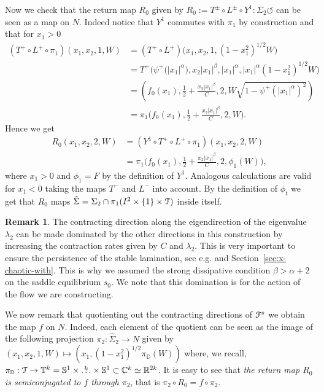 \documentclass[reqno,12pt,a4paper]{amsart}
\theoremstyle{plain}
\theoremstyle{definition}
\newtheorem{remark}[theorem]{Remark}
\begin{document}
Now we check that the return map $R_0$ given by
$
R_0:= T^\pm \circ L^\pm \circ Y^1:\Sigma_2\circlearrowleft
$
can be seen as a map on $N$.  Indeed notice that $Y^1$
commutes with $\pi_1$ by construction and that for $x_1>0$
\begin{align*}
  (T^+\circ L^+\circ \pi_1)(x_1,x_2,1,W) &= (T^+\circ
  L^+)\big(x_1,x_2,1,(1-x_1^2)^{1/2} W\big)
  \\
  &= T^+\Big( \psi^+\big(|x_1|^\alpha\big), x_2
  |x_1|^\beta, |x_1|^\alpha, |x_1|^\alpha
  (1-x_1^2)^{1/2} W\Big)
  \\
  &= \left( f_0(x_1), \frac12+\frac{x_2
      |x_1|^\beta}C , 2, W
    \sqrt{1-\psi^+(|x_1|^\alpha)^2} \right)
  \\
  &= \pi_1\Big( f_0(x_1), \frac12+\frac{x_2
    |x_1|^\beta}C , 2, W\Big).
\end{align*}
Hence we  get
\begin{align}
R_0(x_1,x_2,2,W)&= (Y^1\circ T^+\circ L^+ \circ
\pi_1)(x_1,x_2,2,W)
\nonumber
\\
&= \pi_1
\Big( f_0(x_1), \frac12+\frac{x_2
  |x_1|^\beta}C ,
2, \phi_1(W)\Big), \label{eq:returnmap}
\end{align}
where $x_1>0$ and $\phi_1=F$ by the definition of $Y^1$.
Analogous calculations are valid for $x_1<0$ taking the maps
$T^-$ and $L^-$ into account. By the definition of $\phi_t$
we get that $R_0$ maps $\hat \Sigma =
\Sigma_2\cap\pi_1(I^2\times\{1\}\times{\EuScript{T}})$ inside itself.

\begin{remark}
  \label{rmk:domination}
  The contracting direction along the eigendirection of the
  eigenvalue $\lambda_2$ can be made dominated by the other
  directions in this construction by increasing the
  contraction rates given by $C$ and $\lambda_2$. This is
  very important to ensure the persistence of the stable
  lamination, see e.g. \cite{HPS77} and
  Section~\ref{sec:x-chaotic-with}. This is why we assumed
  the strong dissipative condition $\beta>\alpha+2$ on the
  saddle equilibrium $s_0$.  We note that this domination is
  for the action of the flow we are constructing.
\end{remark}

We now remark that quotienting out the contracting
directions of ${\EuScript{F}}^s$ we obtain the map $f$ on $N$.  Indeed,
each element of the quotient can be seen as the image of the
following projection
$
\pi_2:\hat\Sigma_2\to N$ given by
$(x_1,x_2,1,W)\mapsto(x_1,(1-x_1^2)^{1/2}\pi_{{\mathbb D}}(W))$
where, we recall, $\pi_{{\mathbb D}}: {\EuScript{T}}\to{{\mathbb T}}^k={{\mathbb S}}^1 \times
\overset{k}{\dots} \times {{\mathbb S}}^1 \subset {{\mathbb C}}^k \simeq {{\mathbb R}}^{2k}$.
It is easy to see that \emph{the return map $R_0$ is
  semiconjugated to $f$ through $\pi_2$}, that is $
\pi_2\circ R_0 = f\circ \pi_2.  $
\end{document}
